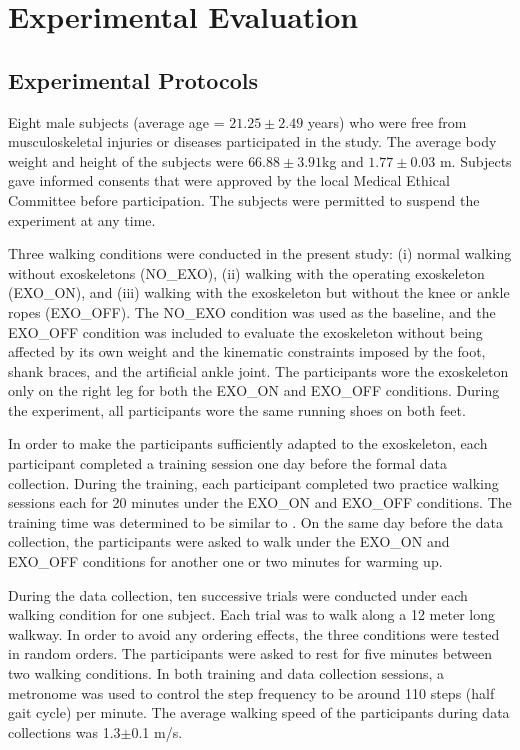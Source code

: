\documentclass[10pt]{asme2ej}
\begin{document}
\section{Experimental Evaluation}
\label{sec:experiment}  

\subsection{Experimental Protocols}

Eight male subjects (average age = $21.25 \pm2.49$ years) who were free from musculoskeletal injuries or diseases participated in the study.
The average body weight and height of the subjects were $66.88\pm3.91$kg and $1.77\pm0.03$ m.
Subjects gave informed consents that were approved by the local Medical Ethical Committee before participation.
The subjects were permitted to suspend the experiment at any time. 

Three walking conditions were conducted in the present study: (i) normal walking without exoskeletons (NO\_EXO), (ii) walking with the operating exoskeleton (EXO\_ON), and (iii) walking with the exoskeleton but without the knee or ankle ropes (EXO\_OFF).
The NO\_EXO condition was used as the baseline, and the EXO\_OFF condition was included to evaluate the exoskeleton without being affected by its own weight and the kinematic constraints imposed by the foot, shank braces, and the artificial ankle joint.
The participants wore the exoskeleton only on the right leg for both the EXO\_ON and EXO\_OFF conditions.
During the experiment, all participants wore the same running shoes on both feet. 

In order to make the participants sufficiently adapted to the exoskeleton, each participant completed a training session one day before the formal data collection.
During the training, each participant completed two practice walking sessions each for 20 minutes under the EXO\_ON and EXO\_OFF conditions.
The training time was determined to be similar to \cite{RN5}.
On the same day before the data collection, the participants were asked to walk under the EXO\_ON and EXO\_OFF conditions for another one or two minutes for warming up.

During the data collection, ten successive trials were conducted under each walking condition for one subject.
Each trial was to walk along a 12 meter long walkway.
In order to avoid any ordering effects, the three conditions were tested in random orders.
The participants were asked to rest for five minutes between two walking conditions.
In both training and data collection sessions, a metronome was used to control the step frequency to be around 110 steps (half gait cycle) per minute.
The average walking speed of the participants during data collections was 1.3$\pm$0.1 m/s.
\end{document}
